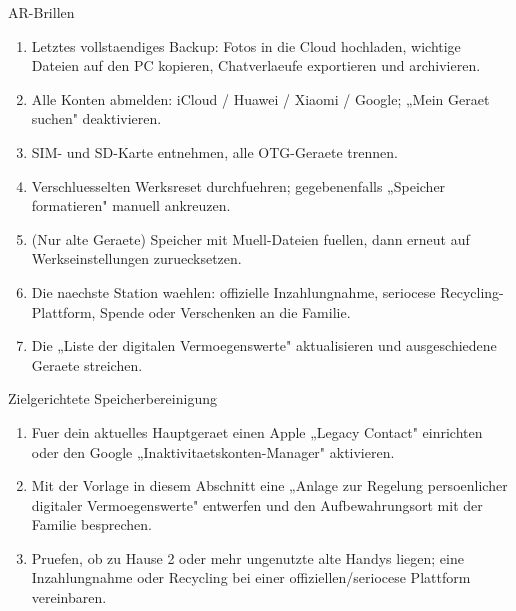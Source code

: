 \begin{tcbpractice}{AR-Brillen}
\begin{enumerate}
  \item Letztes vollstaendiges Backup: Fotos in die Cloud hochladen, wichtige Dateien auf den PC kopieren, Chatverlaeufe exportieren und archivieren.
  \item Alle Konten abmelden: iCloud / Huawei / Xiaomi / Google; „Mein Geraet suchen" deaktivieren.
  \item SIM- und SD-Karte entnehmen, alle OTG-Geraete trennen.
  \item Verschluesselten Werksreset durchfuehren; gegebenenfalls „Speicher formatieren" manuell ankreuzen.
  \item (Nur alte Geraete) Speicher mit Muell-Dateien fuellen, dann erneut auf Werkseinstellungen zuruecksetzen.
  \item Die naechste Station waehlen: offizielle Inzahlungnahme, seriocese Recycling-Plattform, Spende oder Verschenken an die Familie.
  \item Die „Liste der digitalen Vermoegenswerte" aktualisieren und ausgeschiedene Geraete streichen.
\end{enumerate}

\end{tcbpractice}

\begin{tcbpractice}{Zielgerichtete Speicherbereinigung}
\begin{enumerate}
  \item Fuer dein aktuelles Hauptgeraet einen Apple „Legacy Contact" einrichten oder den Google „Inaktivitaetskonten-Manager" aktivieren.
  \item Mit der Vorlage in diesem Abschnitt eine „Anlage zur Regelung persoenlicher digitaler Vermoegenswerte" entwerfen und den Aufbewahrungsort mit der Familie besprechen.
  \item Pruefen, ob zu Hause 2 oder mehr ungenutzte alte Handys liegen; eine Inzahlungnahme oder Recycling bei einer offiziellen/seriocese Plattform vereinbaren.
\end{enumerate}

\end{tcbpractice}
